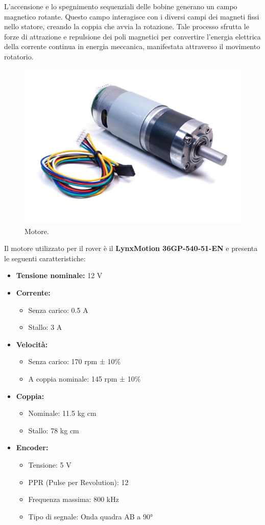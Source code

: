 \documentclass{article}
\begin{document}
L'accensione e lo spegnimento sequenziali delle bobine generano un campo magnetico rotante. Questo campo interagisce con i diversi campi dei magneti fissi nello statore, creando la coppia che avvia la rotazione. Tale processo sfrutta le forze di attrazione e repulsione dei poli magnetici per convertire l'energia elettrica della corrente continua in energia meccanica, manifestata attraverso il movimento rotatorio.
\begin{figure}[H]
\centering
\includegraphics[width=0.7\linewidth]{image/motore.png}
\caption{\label{motore:pot}Motore.}
\end{figure}
Il motore utilizzato per il rover è il \textbf{LynxMotion 36GP-540-51-EN} e presenta le seguenti caratteristiche:

\begin{itemize}
    \item \textbf{Tensione nominale:} 12 V
    \item \textbf{Corrente:}
    \begin{itemize}
        \item Senza carico: 0.5 A
        \item Stallo: 3 A
    \end{itemize}
    \item \textbf{Velocità:}
    \begin{itemize}
        \item Senza carico: 170 rpm ± 10\%
        \item A coppia nominale: 145 rpm ± 10\%
    \end{itemize}
    \item \textbf{Coppia:}
    \begin{itemize}
        \item Nominale: 11.5 kg cm
        \item Stallo: 78 kg cm
    \end{itemize}
    \item \textbf{Encoder:}
    \begin{itemize}
        \item Tensione: 5 V
        \item PPR (Pulse per Revolution): 12
        \item Frequenza massima: 800 kHz
        \item Tipo di segnale: Onda quadra AB a 90°
    \end{itemize}
\end{itemize}
\end{document}
